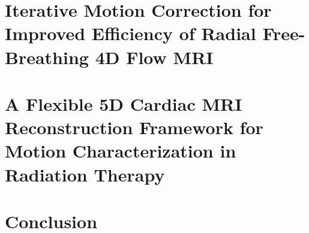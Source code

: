 \documentclass[12pt]{report}
\begin{document}
\chapter{Iterative Motion Correction for Improved Efficiency of Radial Free-Breathing 4D Flow MRI}\label{ch:imoco}


\chapter{A Flexible 5D Cardiac MRI Reconstruction Framework for Motion Characterization in Radiation Therapy}\label{ch:5DMRI}


\chapter{Conclusion}\label{ch:conclusion}


% 

\singlespacing{}
\printbibliography[]
\end{document}

